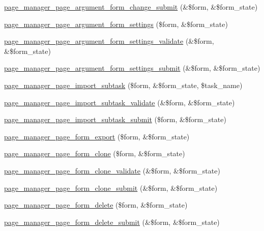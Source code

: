 \begin{DoxyCompactItemize}
\item 
\hyperlink{page_8admin_8inc_ac73bacefd1b8a2cca51a100f9e63354c}{page\_\-manager\_\-page\_\-argument\_\-form\_\-change\_\-submit} (\&\$form, \&\$form\_\-state)
\item 
\hyperlink{page_8admin_8inc_adb96c0403fa9be5216a7638e0ac7d729}{page\_\-manager\_\-page\_\-argument\_\-form\_\-settings} (\$form, \&\$form\_\-state)
\item 
\hyperlink{page_8admin_8inc_a38198c5b12e1c5ca00fd71d5270f4758}{page\_\-manager\_\-page\_\-argument\_\-form\_\-settings\_\-validate} (\&\$form, \&\$form\_\-state)
\item 
\hyperlink{page_8admin_8inc_a3f75567ac4098a396875e986a3e3c027}{page\_\-manager\_\-page\_\-argument\_\-form\_\-settings\_\-submit} (\&\$form, \&\$form\_\-state)
\item 
\hyperlink{page_8admin_8inc_a506bcc1dfa1fd86e2cfe581842e54e30}{page\_\-manager\_\-page\_\-import\_\-subtask} (\$form, \&\$form\_\-state, \$task\_\-name)
\item 
\hyperlink{page_8admin_8inc_ae5d65999777c0cd66feb5baa3ef6d16d}{page\_\-manager\_\-page\_\-import\_\-subtask\_\-validate} (\&\$form, \&\$form\_\-state)
\item 
\hyperlink{page_8admin_8inc_ab8bec4270961943c7ed320ee9d6fb45e}{page\_\-manager\_\-page\_\-import\_\-subtask\_\-submit} (\$form, \&\$form\_\-state)
\item 
\hyperlink{page_8admin_8inc_a23e5e221703cba1aa7a7c45d134537a9}{page\_\-manager\_\-page\_\-form\_\-export} (\$form, \&\$form\_\-state)
\item 
\hyperlink{page_8admin_8inc_a5f2f6313e319f2b6ab6a9a0045ec6e4f}{page\_\-manager\_\-page\_\-form\_\-clone} (\$form, \&\$form\_\-state)
\item 
\hyperlink{page_8admin_8inc_a3388dc8f1aee6ef242e99cd13585a74b}{page\_\-manager\_\-page\_\-form\_\-clone\_\-validate} (\&\$form, \&\$form\_\-state)
\item 
\hyperlink{page_8admin_8inc_a57a36bfa00a3c056b119c41acc030d16}{page\_\-manager\_\-page\_\-form\_\-clone\_\-submit} (\&\$form, \&\$form\_\-state)
\item 
\hyperlink{page_8admin_8inc_a29dc53e453b375306ff5d02a2a5640cf}{page\_\-manager\_\-page\_\-form\_\-delete} (\$form, \&\$form\_\-state)
\item 
\hyperlink{page_8admin_8inc_a2b4d1d14abfcc04f441e2872fb3f2e6d}{page\_\-manager\_\-page\_\-form\_\-delete\_\-submit} (\&\$form, \&\$form\_\-state)
\end{DoxyCompactItemize}


